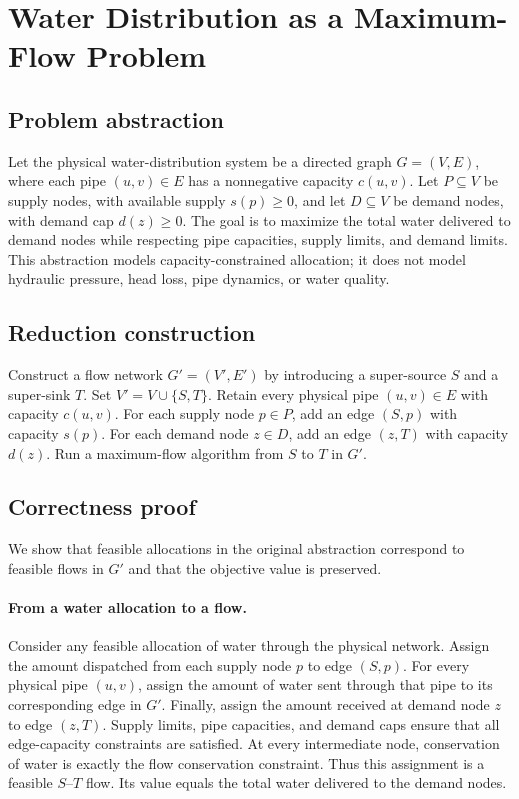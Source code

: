 \section{Water Distribution as a Maximum-Flow Problem}
\label{sec:water-flow}

\subsection{Problem abstraction}
Let the physical water-distribution system be a directed graph
$G=(V,E)$, where each pipe $(u,v)\in E$ has a nonnegative capacity
$c(u,v)$. Let $P\subseteq V$ be supply nodes, with available supply
$s(p)\ge 0$, and let $D\subseteq V$ be demand nodes, with demand cap
$d(z)\ge 0$. The goal is to maximize the total water delivered to demand
nodes while respecting pipe capacities, supply limits, and demand limits.
This abstraction models capacity-constrained allocation; it does not model
hydraulic pressure, head loss, pipe dynamics, or water quality.

\subsection{Reduction construction}
Construct a flow network $G'=(V',E')$ by introducing a super-source $S$
and a super-sink $T$. Set $V'=V\cup\{S,T\}$. Retain every physical
pipe $(u,v)\in E$ with capacity $c(u,v)$. For each supply node $p\in P$,
add an edge $(S,p)$ with capacity $s(p)$. For each demand node $z\in D$,
add an edge $(z,T)$ with capacity $d(z)$. Run a maximum-flow algorithm
from $S$ to $T$ in $G'$.

\subsection{Correctness proof}
We show that feasible allocations in the original abstraction correspond
to feasible flows in $G'$ and that the objective value is preserved.

\paragraph{From a water allocation to a flow.}
Consider any feasible allocation of water through the physical network.
Assign the amount dispatched from each supply node $p$ to edge $(S,p)$.
For every physical pipe $(u,v)$, assign the amount of water sent through
that pipe to its corresponding edge in $G'$. Finally, assign the amount
received at demand node $z$ to edge $(z,T)$. Supply limits, pipe capacities,
and demand caps ensure that all edge-capacity constraints are satisfied.
At every intermediate node, conservation of water is exactly the flow
conservation constraint. Thus this assignment is a feasible $S$--$T$ flow.
Its value equals the total water delivered to the demand nodes.

